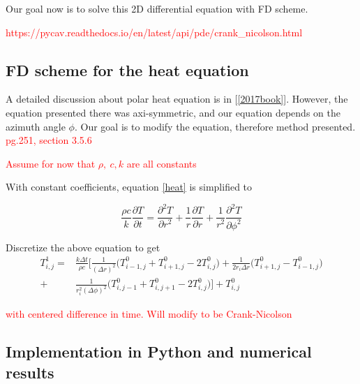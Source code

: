 \documentclass[12pt]{article}
\begin{document}
Our goal now is to solve this 2D differential equation with FD scheme.



\textcolor{red}{https://pycav.readthedocs.io/en/latest/api/pde/crank\_nicolson.html}

\subsection{FD scheme for the heat equation}

A detailed discussion about polar heat equation is in [\ref{2017book}]. However, the equation presented there was axi-symmetric, and our equation depends on the azimuth angle $\phi$. Our goal is to modify the equation, therefore method presented. \textcolor{red}{pg.251, section 3.5.6}

\textcolor{red}{Assume for now that $\rho,\ c, k$ are all constants}

With constant coefficients, equation \eqref{heat} is simplified to 

\begin{equation}
\frac{\rho c}{k}\frac{\partial T}{\partial t}=\frac{\partial^2 T}{\partial r^2}+\frac{1}{r}\frac{\partial T}{\partial r}+\frac{1}{r^2}\frac{\partial^2 T}{\partial \phi^2}\label{simple_heat}
\end{equation}

Discretize the above equation to get
\begin{align}
T^1_{i,j}=& \frac{k\Delta t}{\rho c}\bigg[\frac{1}{(\Delta r)^2}\bigg(T^0_{i-1,j}+T^0_{i+1,j}-2T^0_{i,j}\bigg)+\frac{1}{2r_i\Delta r}\bigg(T^0_{i+1,j}-T^0_{i-1,j}\bigg)\nonumber\\
+&\frac{1}{r_i^2(\Delta \phi)^2}\bigg(T^0_{i,j-1}+T^0_{i,j+1}-2T^0_{i,j}\bigg)\bigg]+T^0_{i,j}
\end{align}

\textcolor{red}{with centered difference in time. Will modify to be Crank-Nicolson}

\subsection{Implementation in Python and numerical results}

\end{document}
